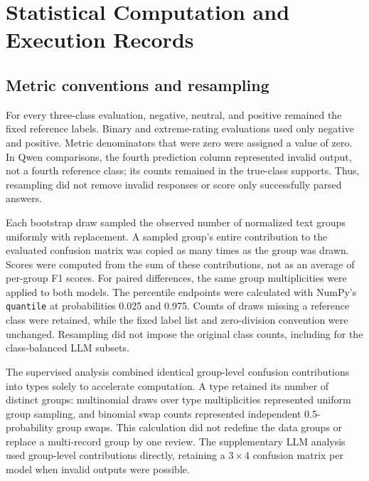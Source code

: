 \section{Statistical Computation and Execution Records}
\label{supp:statistical_implementation}

\subsection{Metric conventions and resampling}
For every three-class evaluation, negative, neutral, and positive remained the fixed reference labels. Binary and extreme-rating evaluations used only negative and positive. Metric denominators that were zero were assigned a value of zero. In Qwen comparisons, the fourth prediction column represented invalid output, not a fourth reference class; its counts remained in the true-class supports. Thus, resampling did not remove invalid responses or score only successfully parsed answers.

Each bootstrap draw sampled the observed number of normalized text groups uniformly with replacement. A sampled group's entire contribution to the evaluated confusion matrix was copied as many times as the group was drawn. Scores were computed from the sum of these contributions, not as an average of per-group F1 scores. For paired differences, the same group multiplicities were applied to both models. The percentile endpoints were calculated with NumPy's \texttt{quantile} at probabilities 0.025 and 0.975. Counts of draws missing a reference class were retained, while the fixed label list and zero-division convention were unchanged. Resampling did not impose the original class counts, including for the class-balanced LLM subsets.

The supervised analysis combined identical group-level confusion contributions into types solely to accelerate computation. A type retained its number of distinct groups: multinomial draws over type multiplicities represented uniform group sampling, and binomial swap counts represented independent 0.5-probability group swaps. This calculation did not redefine the data groups or replace a multi-record group by one review. The supplementary LLM analysis used group-level contributions directly, retaining a $3\times4$ confusion matrix per model when invalid outputs were possible.

